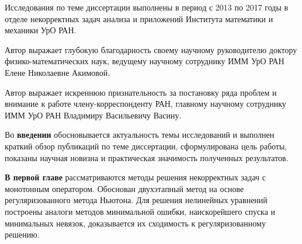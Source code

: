 \documentclass[%
autoref,     %
href,        %
colorlinks,  %
]{disser}
\begin{document}
\contribsection
\contribtext

\structsection
\structtext

Исследования по теме диссертации выполнены в период с 2013 по 2017 годы в отделе некорректных задач анализа и приложений Института математики и механики УрО РАН.

Автор выражает глубокую благодарность своему научному руководителю доктору физико-математических наук, ведущему научному сотруднику ИММ УрО РАН Елене Николаевне Акимовой.

Автор выражает искреннюю признательность за постановку ряда проблем и внимание к работе члену-корреспонденту РАН, главному научному сотруднику ИММ УрО РАН Владимиру Васильевичу Васину.


Во \textbf{введении} обосновывается актуальность темы исследований и выполнен краткий обзор публикаций по теме диссертации, сформулирована цель работы, показаны научная новизна и практическая значимость полученных результатов.

\textbf{В первой главе} рассматриваются методы решения некорректных задач с монотонным оператором. Обоснован двухэтапный метод на основе  регуляризованного метода Ньютона. Для  решения нелинейных уравнений построены аналоги методов минимальной ошибки, наискорейшего спуска и минимальных невязок, доказывается их сходимость к регуляризованному решению.
\end{document}

